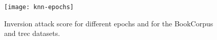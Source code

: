 \begin{figure}[h]
	\centering
	\texttt{[image: knn-epochs]} %
	\renewcommand*{\glstextformat}[1]{\textcolor{MatplotlibTwo}{#1}}
	\caption[Inversion attack \FOne{} score for different epochs]{
		Inversion attack \FOne{} score for different epochs and for the {\color{MatplotlibOne}BookCorpus} and \acrshort{trec} datasets.
	}\label{figure:knn-epochs}
	\renewcommand*{\glstextformat}[1]{\textcolor{DarkerRed}{#1}}
\end{figure}
